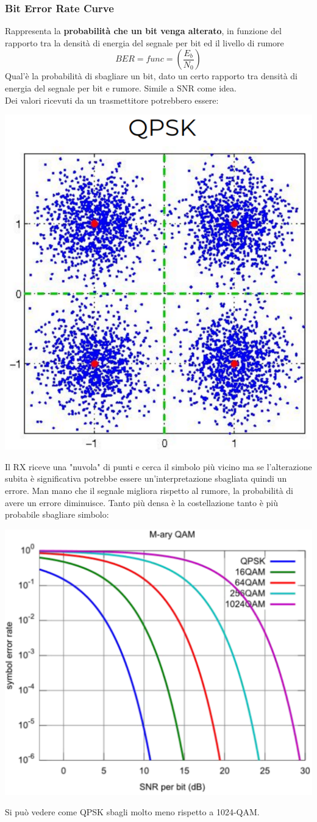 \newpage

\subsubsection{Bit Error Rate Curve}
Rappresenta la \textbf{probabilità che un bit venga alterato}, in funzione del rapporto tra la densità di energia del segnale per bit ed il livello di rumore
$$ BER = func = \left( \frac{E_b}{N_0} \right)$$
Qual'è la probabilità di sbagliare un bit, dato un certo rapporto tra densità di energia del segnale per bit e rumore. Simile a SNR come idea.\\
Dei valori ricevuti da un trasmettitore potrebbero essere:
\begin{center}
	\includegraphics[width=0.35\linewidth]{img/wireless/esval}
\end{center}

Il RX riceve una "nuvola" di punti e cerca il simbolo più vicino ma se l'alterazione subita è significativa potrebbe essere un'interpretazione sbagliata quindi un errore. Man mano che il segnale migliora rispetto al rumore, la probabilità di avere un errore diminuisce. Tanto più densa è la costellazione tanto è più probabile sbagliare simbolo:
\begin{center}
	\includegraphics[width=0.5\linewidth]{img/wireless/maryqam}
\end{center}
Si può vedere come QPSK sbagli molto meno rispetto a 1024-QAM.

